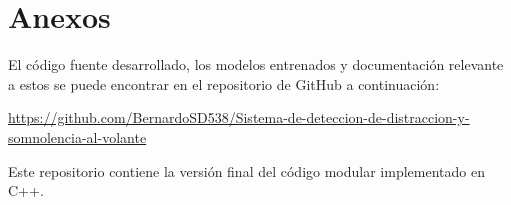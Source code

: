 \documentclass[
A4paper,                %
twoside,                %
openright,              %
chapterprefix=true,     %
12pt,                   %
headings=normal,        %
titlepage=on            %
]{book}
\begin{document}
\frontmatter
\pagestyle{empty}				    %

\newpage

\pagestyle{plain}				    %

\newpage


\newpage

\newpage

\newpage


\setcounter{tocdepth}{3}		%
\tableofcontents				%


\cleardoublepage
{}
\listoffigures

\cleardoublepage
{}
\listoftables
\cleardoublepage




\mainmatter
{}			%
\setcounter{page}{1}			%
\pagestyle{fancy} 	            %
\parskip=7pt                    %
\parindent=0pt                  %




% 



% 

\cleardoublepage

\backmatter
\printbibliography[title=Referencias, heading=bibintoc]

\appendix
\chapter{Anexos}

El código fuente desarrollado, los modelos entrenados y documentación relevante a estos se puede encontrar en el repositorio de GitHub a continuación:

\begin{center}
\url{https://github.com/BernardoSD538/Sistema-de-deteccion-de-distraccion-y-somnolencia-al-volante}
\end{center}

Este repositorio contiene la versión final del código modular implementado en C++.

\end{document}
